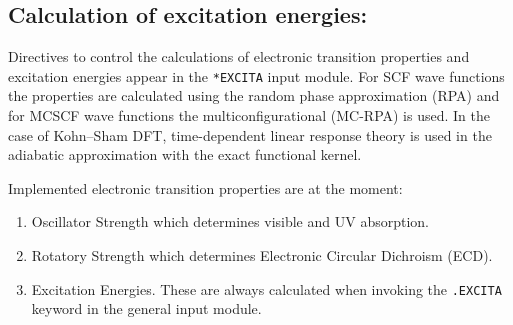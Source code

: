 \subsection{Calculation of excitation energies: }
\label{sec:excita}

Directives to control the calculations of electronic
transition
properties and excitation energies appear in
the \verb|*EXCITA| input module.
For SCF wave
functions the properties are calculated using the 
random phase approximation (RPA) and for MCSCF
wave functions the multiconfigurational (MC-RPA) is used.
In the case of Kohn--Sham DFT, time-dependent linear response theory
is used in the adiabatic approximation with the exact functional kernel.

Implemented electronic transition properties are at the moment:

\begin{enumerate}
\item Oscillator Strength which determines
visible and UV absorption. 
\item Rotatory Strength which determines
Electronic Circular Dichroism
(ECD).
\item Excitation Energies. 
These are always calculated when
invoking the \verb|.EXCITA| keyword in the general input module.
\end{enumerate}

